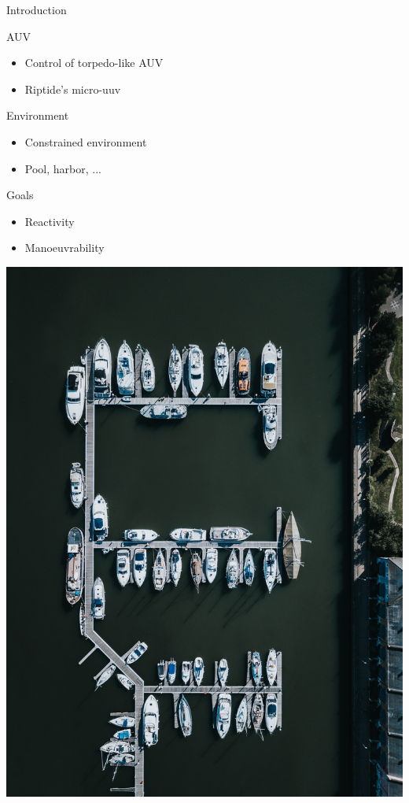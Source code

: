 \documentclass[10pt, xcolor={usenames, dvipsnames}]{beamer}
\begin{document}
        \begin{frame}{Introduction}
            \begin{minipage}[c]{0.55\textwidth}
                \begin{block}{AUV}
                    \vspace{0.25cm}
                    \begin{itemize}
                        \item Control of torpedo-like AUV \\ 
                        \item Riptide's micro-uuv
                    \end{itemize}
                \end{block}
                \begin{block}{Environment}
                    \begin{itemize}
                        \item Constrained environment \\ 
                        \item Pool, harbor, ...
                    \end{itemize}
                \end{block}
                \begin{block}{Goals}
                    \begin{itemize}
                        \item Reactivity \\
                        \item Manoeuvrability
                    \end{itemize}
                \end{block}
            \end{minipage}
            \hfill
            \begin{minipage}[c]{0.4\textwidth}
                \includegraphics[height=\textwidth, angle=90, origin=c, trim={3cm 0 10cm 0}, clip]{imgs/harbour.jpg}

\end{minipage}
\end{frame}
\end{document}
